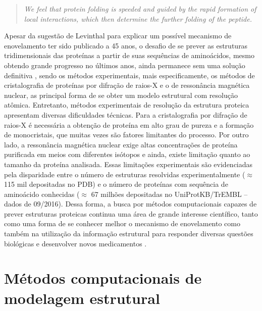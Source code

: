 \begin{quote}
\textit{We feel that protein folding is speeded and guided by the rapid formation of local interactions, which then determine the further folding of the peptide.}
\end{quote}

Apesar da sugestão de Levinthal para explicar um possível mecanismo de enovelamento ter sido publicado a 45 anos, o desafio de se prever as estruturas tridimensionais das proteínas a partir de suas sequências de aminoácidos, mesmo obtendo grande progresso no últimos anos, ainda permanece sem uma solução definitiva \cite{Moult:2009}, sendo os métodos experimentais, mais especificamente, os métodos de cristalografia de proteínas por difração de raios-X e o de ressonância magnética nuclear, as principal forma de se obter um modelo estrutural com resolução atômica. Entretanto, métodos experimentais de resolução da estrutura proteica apresentam diversas dificuldades técnicas. Para a cristalografia por difração de raios-X é necessária a obtenção de proteína em alto grau de pureza e a formação de monocristais, que muitas vezes são fatores limitantes do processo. Por outro lado, a ressonância magnética nuclear exige altas concentrações de proteína purificada em meios com diferentes isótopos e ainda, existe limitação quanto ao tamanho da proteína analisada. Essas limitações experimentais são evidenciadas pela disparidade entre o número de estruturas resolvidas experimentalmente ($\approx$ 115 mil depositadas no PDB) e o número de proteínas com sequência de aminoácido conhecidas ($\approx$ 67 milhões depositadas no UniProtKB/TrEMBL – dados de 09/2016). Dessa forma, a busca por métodos computacionais capazes de prever estruturas proteicas continua uma área de grande interesse científico, tanto como uma forma de se conhecer melhor o mecanismo de enovelamento como também na utilização da informação estrutural para responder diversas questões biológicas e desenvolver novos medicamentos \cite{Baker:1996}.

\section{Métodos computacionais de modelagem estrutural}

